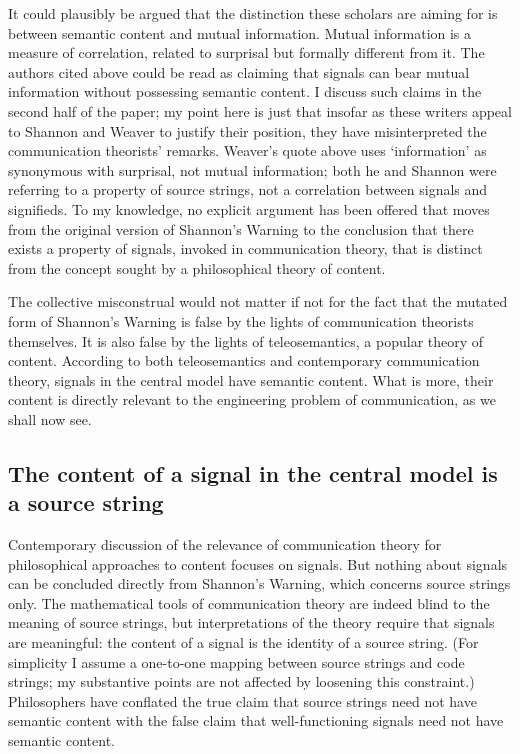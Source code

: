 It could plausibly be argued that the distinction these scholars are aiming for is between semantic content and mutual information.
Mutual information is a measure of correlation, related to surprisal but formally different from it.
The authors cited above could be read as claiming that signals can bear mutual information without possessing semantic content.
I discuss such claims in the second half of the paper; my point here is just that insofar as these writers appeal to Shannon and Weaver to justify their position, they have misinterpreted the communication theorists' remarks.
Weaver's quote above uses `information' as synonymous with surprisal, not mutual information; both he and Shannon were referring to a property of source strings, not a correlation between signals and signifieds.
To my knowledge, no explicit argument has been offered that moves from the original version of {\sc Shannon's Warning} to the conclusion that there exists a property of signals, invoked in communication theory, that is distinct from the concept sought by a philosophical theory of content.

The collective misconstrual would not matter if not for the fact that the mutated form of {\sc Shannon's Warning} is false by the lights of communication theorists themselves.
It is also false by the lights of teleosemantics, a popular theory of content.
According to both teleosemantics and contemporary communication theory, signals in the central model have semantic content.
What is more, their content is directly relevant to the engineering problem of communication, as we shall now see.


\subsection{The content of a signal in the central model is a source string}\label{subsec:signalContent}

Contemporary discussion of the relevance of communication theory for philosophical approaches to content focuses on signals.
But nothing about signals can be concluded directly from {\sc Shannon's Warning}, which concerns source strings only.
The mathematical tools of communication theory are indeed blind to the meaning of source strings, but interpretations of the theory require that signals are meaningful: the content of a signal is the identity of a source string.
(For simplicity I assume a one-to-one mapping between source strings and code strings; my substantive points are not affected by loosening this constraint.)
Philosophers have conflated the true claim that source strings need not have semantic content with the false claim that well-functioning signals need not have semantic content.

